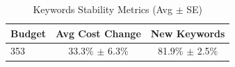 \begin{table}[htbp]
\centering
\caption{Keywords Stability Metrics (Avg $\pm$ SE)}
\begin{tabular}{lcc}
\toprule
Budget & Avg Cost Change & New Keywords \\
\midrule
353 & 33.3\% $\pm$ 6.3\% & 81.9\% $\pm$ 2.5\% \\
\bottomrule
\end{tabular}
\end{table}